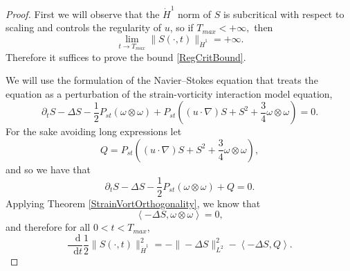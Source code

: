 \documentclass[11pt]{article}
\theoremstyle{plain}
\theoremstyle{remark}
\numberwithin{equation}{section}
\newcommand{\diff}{\mathop{}\!\mathrm{d}}
\begin{document}
\begin{proof}
First we will observe that the $\dot{H}^1$ norm of $S$ is subcritical with respect to scaling and controls the regularity of $u$, so if $T_{max}<+\infty,$ then
\begin{equation}
    \lim_{t \to T_{max}}
    \|S(\cdot,t)\|_{\dot{H}^1}
    =+\infty.
\end{equation}
Therefore it suffices to prove the bound \eqref{RegCritBound}.


We will use the formulation of the Navier--Stokes equation that treats the equation as a perturbation of the strain-vorticity interaction model equation,
\begin{equation}
    \partial_t S-\Delta S
    -\frac{1}{2}P_{st}\left(\omega\otimes\omega\right)
    +P_{st}\left((u\cdot\nabla)S+S^2
    +\frac{3}{4}\omega\otimes\omega\right)=0.
\end{equation}
For the sake avoiding long expressions let
\begin{equation}
    Q=P_{st}\left((u\cdot\nabla)S+S^2
    +\frac{3}{4}\omega\otimes\omega\right),
\end{equation}
and so we have that
\begin{equation}
    \partial_t S-\Delta S
    -\frac{1}{2}P_{st}\left(\omega\otimes\omega\right)
    +Q=0.
\end{equation}
Applying Theorem \ref{StrainVortOrthogonality}, we know that
\begin{equation}
    \left<-\Delta S, \omega\otimes\omega\right>=0,
\end{equation}
and therefore for all $0<t<T_{max}$,
\begin{equation}
    \frac{\diff}{\diff t} 
    \frac{1}{2} \|S(\cdot,t)\|_{\dot{H}^1}^2
    =
    -\|-\Delta S\|_{L^2}^2-\left<-\Delta S, Q\right>.
\end{equation}


\end{proof}
\end{document}
